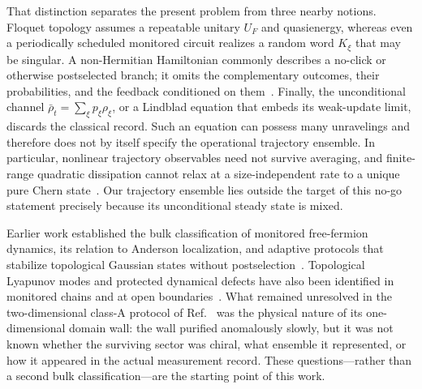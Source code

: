 \documentclass[aps,prl,twocolumn,nofootinbib,superscriptaddress]{revtex4-2}
\begin{document}
That distinction separates the present problem from three nearby notions.  Floquet topology assumes a repeatable unitary $U_F$ and quasienergy, whereas even a periodically scheduled monitored circuit realizes a random word $K_\xi$ that may be singular.  A non-Hermitian Hamiltonian commonly describes a no-click or otherwise postselected branch; it omits the complementary outcomes, their probabilities, and the feedback conditioned on them~\cite{Fleckenstein2022,Kells2023}.  Finally, the unconditional channel $\bar\rho_t=\sum_\xi p_\xi\rho_\xi$, or a Lindblad equation that embeds its weak-update limit, discards the classical record.  Such an equation can possess many unravelings and therefore does not by itself specify the operational trajectory ensemble.  In particular, nonlinear trajectory observables need not survive averaging, and finite-range quadratic dissipation cannot relax at a size-independent rate to a unique pure Chern state~\cite{Diehl2011,Bardyn2013,Budich2015,Goldstein2019}.  Our trajectory ensemble lies outside the target of this no-go statement precisely because its unconditional steady state is mixed.

Earlier work established the bulk classification of monitored free-fermion dynamics, its relation to Anderson localization, and adaptive protocols that stabilize topological Gaussian states without postselection~\cite{Jian2022,Kells2023,BhuiyanPanJian2026,XiaoKawabata2026}.  Topological Lyapunov modes and protected dynamical defects have also been identified in monitored chains and at open boundaries~\cite{Oshima2025,PanShapourianJian2025,XiaoKawabata2026}.  What remained unresolved in the two-dimensional class-A protocol of Ref.~\cite{BhuiyanPanJian2026} was the physical nature of its one-dimensional domain wall: the wall purified anomalously slowly, but it was not known whether the surviving sector was chiral, what ensemble it represented, or how it appeared in the actual measurement record.  These questions---rather than a second bulk classification---are the starting point of this work.
\end{document}
